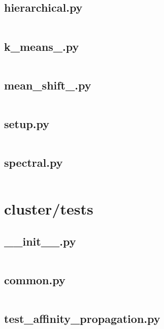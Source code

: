 \documentclass{article}
\begin{document}
\subsection{hierarchical.py}
\inputminted{python}{/home/dufferzafar/dev/@clones/scikit-learn/sklearn/cluster/hierarchical.py}
\newpage

\subsection{k\_means\_.py}
\inputminted{python}{/home/dufferzafar/dev/@clones/scikit-learn/sklearn/cluster/k_means_.py}
\newpage

\subsection{mean\_shift\_.py}
\inputminted{python}{/home/dufferzafar/dev/@clones/scikit-learn/sklearn/cluster/mean_shift_.py}
\newpage

\subsection{setup.py}
\inputminted{python}{/home/dufferzafar/dev/@clones/scikit-learn/sklearn/cluster/setup.py}
\newpage

\subsection{spectral.py}
\inputminted{python}{/home/dufferzafar/dev/@clones/scikit-learn/sklearn/cluster/spectral.py}
\newpage

\section{cluster/tests}

\subsection{\_\_init\_\_.py}
\inputminted{python}{/home/dufferzafar/dev/@clones/scikit-learn/sklearn/cluster/tests/__init__.py}
\newpage

\subsection{common.py}
\inputminted{python}{/home/dufferzafar/dev/@clones/scikit-learn/sklearn/cluster/tests/common.py}
\newpage

\subsection{test\_affinity\_propagation.py}
\inputminted{python}{/home/dufferzafar/dev/@clones/scikit-learn/sklearn/cluster/tests/test_affinity_propagation.py}
\newpage
\end{document}
